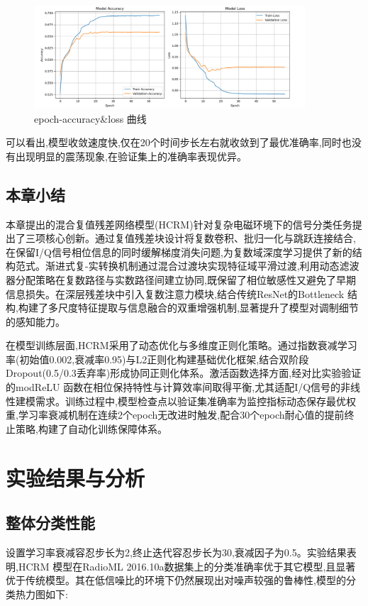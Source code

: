 \documentclass{article}
\begin{document}
\begin{CJK}{UTF8}{gbsn}
\begin{figure}[H]
    \centering
    \includegraphics[width=0.9\textwidth]{figure/image10.png}
    \caption{epoch-accuracy\&loss 曲线}
    \label{fig:epoch_curve}
\end{figure}

可以看出,模型收敛速度快,仅在20个时间步长左右就收敛到了最优准确率,同时也没有出现明显的震荡现象,在验证集上的准确率表现优异。

\subsection{本章小结}
本章提出的混合复值残差网络模型(HCRM)针对复杂电磁环境下的信号分类任务提出了三项核心创新。通过复值残差块设计将复数卷积、批归一化与跳跃连接结合,在保留I/Q信号相位信息的同时缓解梯度消失问题,为复数域深度学习提供了新的结构范式。渐进式复-实转换机制通过混合过渡块实现特征域平滑过渡,利用动态滤波器分配策略在复数路径与实数路径间建立协同,既保留了相位敏感性又避免了早期信息损失。在深层残差块中引入复数注意力模块,结合传统ResNet的Bottleneck 结构,构建了多尺度特征提取与信息融合的双重增强机制,显著提升了模型对调制细节的感知能力。

在模型训练层面,HCRM采用了动态优化与多维度正则化策略。通过指数衰减学习率(初始值0.002,衰减率0.95)与L2正则化构建基础优化框架,结合双阶段 Dropout(0.5/0.3丢弃率)形成协同正则化体系。激活函数选择方面,经对比实验验证的modReLU 函数在相位保持特性与计算效率间取得平衡,尤其适配I/Q信号的非线性建模需求。训练过程中,模型检查点以验证集准确率为监控指标动态保存最优权重,学习率衰减机制在连续2个epoch无改进时触发,配合30个epoch耐心值的提前终止策略,构建了自动化训练保障体系。

\newpage
\section{实验结果与分析}

\subsection{整体分类性能}
设置学习率衰减容忍步长为2,终止迭代容忍步长为30,衰减因子为0.5。实验结果表明,HCRM 模型在RadioML 2016.10a数据集上的分类准确率优于其它模型,且显著优于传统模型。其在低信噪比的环境下仍然展现出对噪声较强的鲁棒性,模型的分类热力图如下:


\end{CJK}
\end{document}
